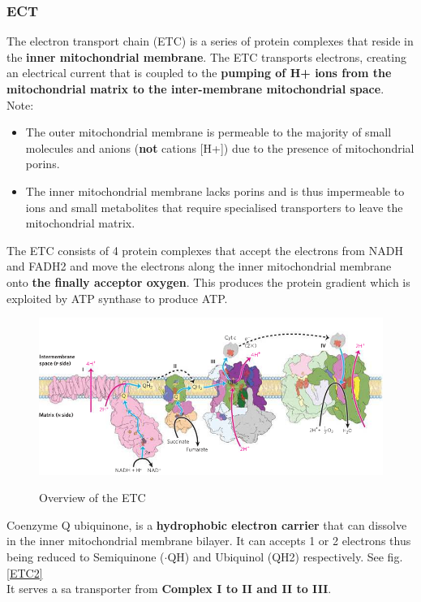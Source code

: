 \documentclass[../main.tex]{subfiles}
\begin{document}
\subsubsection{ECT}
The electron transport chain (ETC) is a series of protein complexes that reside in the \textbf{inner mitochondrial membrane}. The ETC transports electrons, creating an electrical current that is coupled to the \textbf{pumping of H+ ions from the mitochondrial matrix to the inter-membrane mitochondrial space}. \\
Note: 
\begin{itemize}
	\item The outer mitochondrial membrane is permeable to the majority of small molecules and anions (\textbf{not} cations [H+]) due to the presence of mitochondrial porins.
	\item The inner mitochondrial membrane lacks porins and is thus impermeable to ions and small metabolites that require specialised transporters to leave the mitochondrial matrix. 
\end{itemize}
\noindent 
The ETC consists of 4 protein complexes that accept the electrons from NADH and FADH2 and move the electrons along the inner mitochondrial membrane onto \textbf{the finally acceptor oxygen}. This produces the protein gradient which is exploited by ATP synthase to produce ATP.

\begin{figure}[H]
	\centering
	\includegraphics[width = 0.8 \textwidth]{ETC0}
	\label{ETC0}
	\caption{Overview of the ETC}
\end{figure}  

\begin{RemarkWithTitel}{Coenzyme Q}
	\gls{ubiquinone}, is a \textbf{hydrophobic electron carrier} that can dissolve in the inner mitochondrial membrane bilayer. It can accepts 1 or 2 electrons thus being reduced to Semiquinone ($\boldsymbol{\cdot}$QH) and Ubiquinol (QH2) respectively. See fig. \ref{ETC2}\\
	It serves a sa transporter from \textbf{Complex I to II and II to III}. 
\end{RemarkWithTitel}
\end{document}

